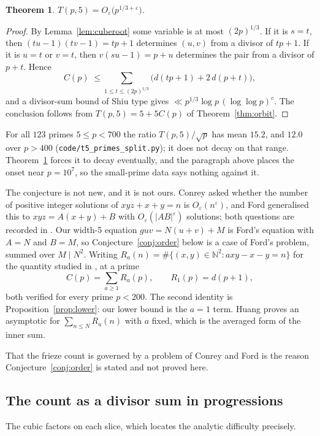 \documentclass[11pt]{article}
\theoremstyle{plain}
\newtheorem{theorem}{Theorem}[section]
\theoremstyle{definition}
\newcommand{\N}{\mathbb{N}}
\begin{document}
\begin{theorem}\label{thm:primecube}
$T(p,5)=O_{\varepsilon}\bigl(p^{1/3+\varepsilon}\bigr)$.
\end{theorem}

\begin{proof}
By Lemma~\ref{lem:cuberoot} some variable is at most $(2p)^{1/3}$. If it is $s=t$, then
$(tu-1)(tv-1)=tp+1$ determines $(u,v)$ from a divisor of $tp+1$. If it is $u=t$ or $v=t$,
then $v(su-1)=p+u$ determines the pair from a divisor of $p+t$. Hence
\[
  C(p)\;\le\sum_{1\le t\le(2p)^{1/3}}\bigl(d(tp+1)+2\,d(p+t)\bigr),
\]
and a divisor-sum bound of Shiu type \cite{Shiu} gives
$\ll p^{1/3}\log p\,(\log\log p)^{c}$. The conclusion follows from
$T(p,5)=5+5C(p)$ of Theorem~\ref{thm:orbit}.
\end{proof}

For all $123$ primes $5\le p<700$ the ratio $T(p,5)/\sqrt p$ has mean $15.2$, and $12.0$
over $p>400$ (\texttt{code/t5\_primes\_split.py}); it does not decay on that range.
Theorem~\ref{thm:primecube} forces it to decay eventually, and the paragraph above places
the onset near $p=10^7$, so the small-prime data says nothing against it.

The conjecture is not new, and it is not ours. Conrey asked whether the number of positive
integer solutions of $xyz+x+y=n$ is $O_\varepsilon(n^{\varepsilon})$, and Ford generalised
this to $xyz=A(x+y)+B$ with $O_\varepsilon(|AB|^{\varepsilon})$ solutions; both questions
are recorded in \cite{Huang}. Our width-5 equation $guv=N(u+v)+M$ is Ford's equation with
$A=N$ and $B=M$, so Conjecture~\ref{conj:order} below is a case of Ford's problem, summed
over $M\mid N^2$. Writing $R_a(n)=\#\{(x,y)\in\N^2: axy-x-y=n\}$ for the quantity studied
in \cite{Huang}, at a prime
\[
  C(p)=\sum_{a\ge1}R_a(p), \qquad R_1(p)=d(p+1),
\]
both verified for every prime $p<200$. The second identity is Proposition~\ref{prop:lower}:
our lower bound is the $a=1$ term. Huang proves an asymptotic for $\sum_{n\le N}R_a(n)$
with $a$ fixed, which is the averaged form of the inner sum.

That the frieze count is governed by a problem of Conrey and Ford is the reason
Conjecture~\ref{conj:order} is stated and not proved here.

\subsection{The count as a divisor sum in progressions}

The cubic factors on each slice, which locates the analytic difficulty precisely.
\end{document}
